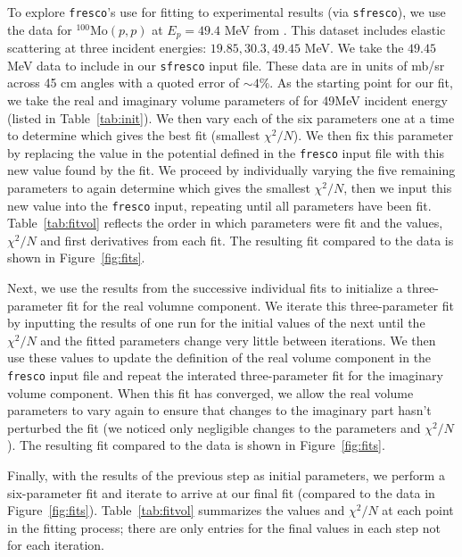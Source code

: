 \documentclass[]{scrartcl}
\begin{document}
To explore \texttt{fresco}'s use for fitting to experimental results (via \texttt{sfresco}), we use the data for $ ^{100} \mathrm{Mo} (p,p)$ at $E_p = 49.4$ MeV from \citep{Sinha1972}. This dataset includes  elastic scattering at three incident energies: $19.85,30.3,49.45$ MeV. We take the $49.45$ MeV data to include in our \texttt{sfresco} input file. These data are in units of mb/sr across 45 cm angles with a quoted error of $\sim 4 \%$. As the starting point for our fit, we take the real and imaginary volume parameters of \citep{Menet1971} for 49MeV incident energy (listed in Table~\ref{tab:init}). We then vary each of the six parameters one at a time to determine which gives the best fit (smallest $\chi ^2 / N$). We then fix this parameter by replacing the value in the potential defined in the \texttt{fresco} input file with this new value found by the fit. We proceed by individually varying the five remaining parameters to again determine which gives the smallest $\chi ^2 / N$, then we input this new value into the \texttt{fresco} input, repeating until all parameters have been fit. Table~\ref{tab:fitvol} reflects the order in which parameters were fit and the values, $\chi ^2 / N$ and first derivatives from each fit. The resulting fit compared to the data is shown in Figure~\ref{fig:fits}.

Next, we use the results from the successive individual fits to initialize a three-parameter fit for the real volumne component. We iterate this three-parameter fit by inputting the results of one run for the initial values of the next until the $\chi ^2 /N$ and the fitted parameters change very little between iterations. We then use these values to update the definition of the real volume component in the \texttt{fresco} input file and repeat the interated three-parameter fit for the imaginary volume component. When this fit has converged, we allow the real volume parameters to vary again to ensure that changes to the imaginary part hasn't perturbed the fit (we noticed only negligible changes to the parameters and $\chi ^2 /N$). The resulting fit compared to the data is shown in Figure~\ref{fig:fits}.

Finally, with the results of the previous step as initial parameters, we perform a six-parameter fit and iterate to arrive at our final fit (compared to the data in Figure~\ref{fig:fits}). Table~\ref{tab:fitvol} summarizes the values and $\chi ^2 / N$ at each point in the fitting process; there are only entries for the final values in each step not for each iteration.
\end{document}
